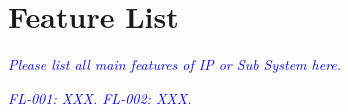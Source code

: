 
\clearpage

\section{Feature List}

\noindent\textit{\textcolor{blue}{Please list all main features of IP or Sub System here.\\}}

\noindent\textit{\textcolor{blue}{
FL-001: XXX.
\newline
FL-002: XXX.
}}
